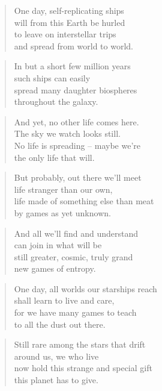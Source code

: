 \documentclass[14pt,a4paper]{article}
\begin{document}
\begin{verse}
One day, self-replicating ships\\
will from this Earth be hurled\\
to leave on interstellar trips\\
and spread from world to world.
\end{verse}

\begin{verse}
In but a short few million years\\
such ships can easily\\
spread many daughter biospheres\\
throughout the galaxy.
\end{verse}

\begin{verse}
And yet, no other life comes here.\\
The sky we watch looks still.\\
No life is spreading – maybe we’re\\
the only life that will.
\end{verse}

\begin{verse}
But probably, out there we’ll meet\\
life stranger than our own,\\
life made of something else than meat\\
by games as yet unknown.
\end{verse}

\begin{verse}
And all we’ll find and understand\\
can join in what will be\\
still greater, cosmic, truly grand\\
new games of entropy.
\end{verse}

\begin{verse}
One day, all worlds our starships reach\\
shall learn to live and care,\\
for we have many games to teach\\
to all the dust out there.
\end{verse}


\begin{verse}
Still rare among the stars that drift\\
around us, we who live\\
now hold this strange and special gift\\
this planet has to give.
\end{verse}
\end{document}
